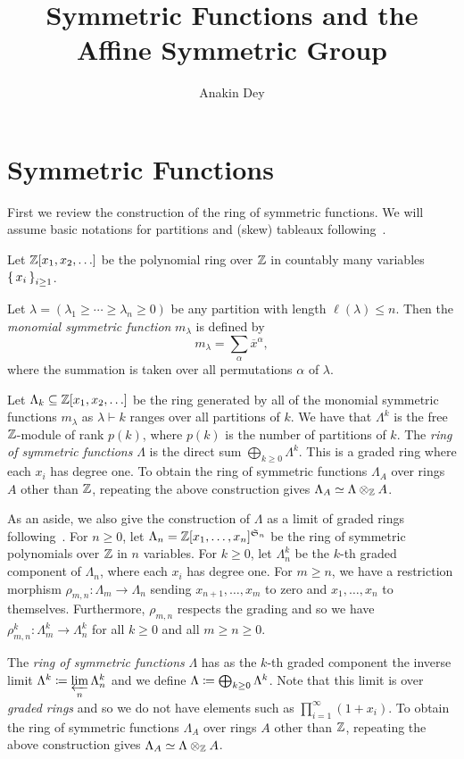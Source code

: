 \documentclass[letterpaper]{article}
\title{Symmetric Functions and the Affine Symmetric Group}
\author{Anakin Dey}
\begin{document}
\maketitle

\section{Symmetric Functions}

First we review the construction of the ring of symmetric functions.
We will assume basic notations for partitions and (skew) tableaux following~\cite{Ful96}.

Let $\mathbb{Z}[x_1, x_2, \ldots]$ be the polynomial ring over $\mathbb{Z}$ in countably many variables $\set{x_i}_{i \geq 1}$.

\begin{defn}
  Let $\lambda = (\lambda_1 \geq \cdots \geq \lambda_n \geq 0)$ be any partition with length $\ell(\lambda) \leq n$.
  Then the \emph{monomial symmetric function} $m_\lambda$ is defined by
  \[
    m_\lambda = \sum_{\alpha} \overline{x}^{\alpha},
  \]
  where the summation is taken over all permutations $\alpha$ of $\lambda$.
\end{defn}

\begin{defn}
  Let $\Lambda_k \subseteq \mathbb{Z}[x_1, x_2, \ldots]$ be the ring generated by all of the monomial symmetric functions $m_\lambda$ as $\lambda \vdash k$ ranges over all partitions of $k$.
  We have that $\Lambda^k$ is the free $\mathbb{Z}$-module of rank $p(k)$, where $p(k)$ is the number of partitions of $k$.
  The \emph{ring of symmetric functions} $\Lambda$ is the direct sum $\bigoplus_{k \geq 0} \Lambda^k$.
  This is a graded ring where each $x_i$ has degree one.
  To obtain the ring of symmetric functions $\Lambda_A$ over rings $A$ other than $\mathbb{Z}$, repeating the above construction gives $\Lambda_A \simeq \Lambda \otimes_{\mathbb{Z}} A$.
  
  As an aside, we also give the construction of $\Lambda$ as a limit of graded rings following~\cite{Mac95}.
  For $n \geq 0$, let $\Lambda_n = \mathbb{Z}[x_1, \ldots, x_n]^{\mathfrak{S}_n}$ be the ring of symmetric polynomials over $\mathbb{Z}$ in $n$ variables.
  For $k \geq 0$, let $\Lambda_n^k$ be the $k$-th graded component of $\Lambda_n$, where each $x_i$ has degree one.
  For $m \geq n$, we have a restriction morphism $\rho_{m, n}\colon \Lambda_m \to \Lambda_n$ sending $x_{n + 1}, \ldots, x_{m}$ to zero and $x_1, \ldots, x_n$ to themselves.
  Furthermore, $\rho_{m, n}$ respects the grading and so we have $\rho_{m, n}^k\colon \Lambda_m^k \to \Lambda_n^k$ for all $k \geq 0$ and all $m \geq n \geq 0$.

  The \emph{ring of symmetric functions} $\Lambda$ has as the $k$-th graded component the inverse limit $\Lambda^k \coloneqq \varprojlim\limits_n \Lambda_n^k$ and we define $\Lambda \coloneqq \bigoplus_{k \geq 0} \Lambda^k$.
  Note that this limit is over \emph{graded rings} and so we do not have elements such as $\prod_{i = 1}^\infty (1 + x_i)$.
  To obtain the ring of symmetric functions $\Lambda_A$ over rings $A$ other than $\mathbb{Z}$, repeating the above construction gives $\Lambda_A \simeq \Lambda \otimes_{\mathbb{Z}} A$.
\end{defn}
\end{document}
